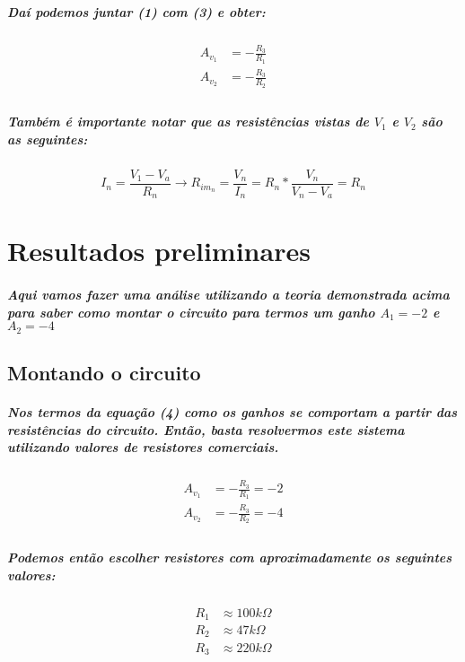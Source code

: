 \documentclass[12pt,twoside, a4paper, twocolumn]{article}
\begin{document}
\subparagraph*{Daí podemos juntar (1) com (3) e obter:}

\begin{equation}
    \begin{aligned}
        A_{v_1} & = -\frac{R_3}{R_1} \\
        A_{v_2} & = -\frac{R_3}{R_2} \\
    \end{aligned}
\end{equation}


\subparagraph*{Também é importante notar que as resistências vistas de $V_1$ e $V_2$ são as seguintes:}
\begin{equation}
    I_n = \frac{V_1-V_a}{R_n} \rightarrow R_{im_n} = \frac
    {V_n}{I_n} = R_n * \frac{V_n}{V_n - V_a} = R_n
\end{equation}

\section{Resultados preliminares}

\subparagraph*{Aqui vamos fazer uma análise utilizando a teoria demonstrada acima para saber como montar o circuito para termos um ganho $A_1 = -2$ e $A_2 = -4$}
\subsection{Montando o circuito}
\subparagraph*{Nos termos da equação (4) como os ganhos se comportam a partir das resistências do circuito. Então, basta resolvermos este sistema utilizando valores de resistores comerciais.}



\begin{equation}
    \begin{aligned}
        A_{v_1} & = -\frac{R_3}{R_1} = -2 \\
        A_{v_2} & = -\frac{R_3}{R_2} = -4 \\
    \end{aligned}
\end{equation}

\subparagraph*{Podemos então escolher resistores com aproximadamente os seguintes valores:}

\begin{equation}
    \begin{aligned}
        R_1 & \approx 100k \varOmega \\
        R_2 & \approx 47k \varOmega  \\
        R_3 & \approx 220k \varOmega \\
    \end{aligned}
\end{equation}
\end{document}
